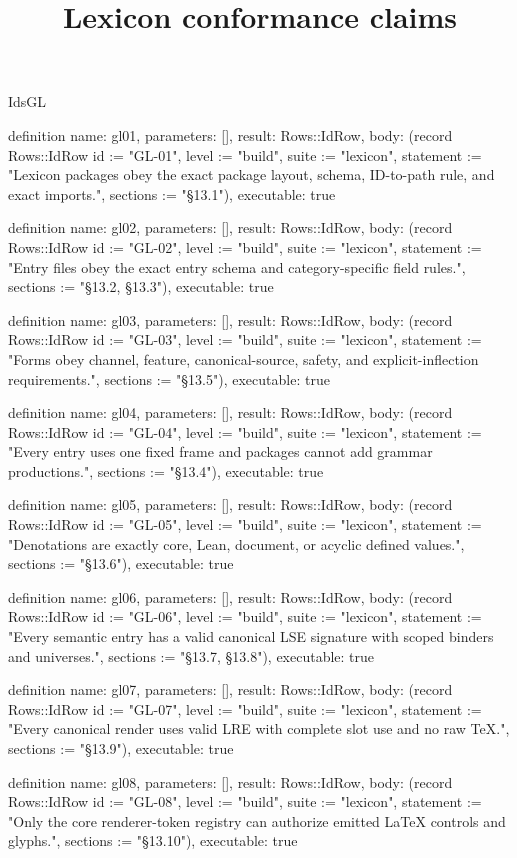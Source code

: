 \begin{lexlean}{IdsGL}
\title{Lexicon conformance claims}
\begin{semanticmodule}
definition{
  name: gl01,
  parameters: [],
  result: Rows::IdRow,
  body: (record Rows::IdRow {id := "GL-01", level := "build", suite := "lexicon", statement := "Lexicon packages obey the exact package layout, schema, ID-to-path rule, and exact imports.", sections := "§13.1"}),
  executable: true
}

definition{
  name: gl02,
  parameters: [],
  result: Rows::IdRow,
  body: (record Rows::IdRow {id := "GL-02", level := "build", suite := "lexicon", statement := "Entry files obey the exact entry schema and category-specific field rules.", sections := "§13.2, §13.3"}),
  executable: true
}

definition{
  name: gl03,
  parameters: [],
  result: Rows::IdRow,
  body: (record Rows::IdRow {id := "GL-03", level := "build", suite := "lexicon", statement := "Forms obey channel, feature, canonical-source, safety, and explicit-inflection requirements.", sections := "§13.5"}),
  executable: true
}

definition{
  name: gl04,
  parameters: [],
  result: Rows::IdRow,
  body: (record Rows::IdRow {id := "GL-04", level := "build", suite := "lexicon", statement := "Every entry uses one fixed frame and packages cannot add grammar productions.", sections := "§13.4"}),
  executable: true
}

definition{
  name: gl05,
  parameters: [],
  result: Rows::IdRow,
  body: (record Rows::IdRow {id := "GL-05", level := "build", suite := "lexicon", statement := "Denotations are exactly core, Lean, document, or acyclic defined values.", sections := "§13.6"}),
  executable: true
}

definition{
  name: gl06,
  parameters: [],
  result: Rows::IdRow,
  body: (record Rows::IdRow {id := "GL-06", level := "build", suite := "lexicon", statement := "Every semantic entry has a valid canonical LSE signature with scoped binders and universes.", sections := "§13.7, §13.8"}),
  executable: true
}

definition{
  name: gl07,
  parameters: [],
  result: Rows::IdRow,
  body: (record Rows::IdRow {id := "GL-07", level := "build", suite := "lexicon", statement := "Every canonical render uses valid LRE with complete slot use and no raw TeX.", sections := "§13.9"}),
  executable: true
}

definition{
  name: gl08,
  parameters: [],
  result: Rows::IdRow,
  body: (record Rows::IdRow {id := "GL-08", level := "build", suite := "lexicon", statement := "Only the core renderer-token registry can authorize emitted LaTeX controls and glyphs.", sections := "§13.10"}),
  executable: true
}


\end{semanticmodule}
\end{lexlean}
